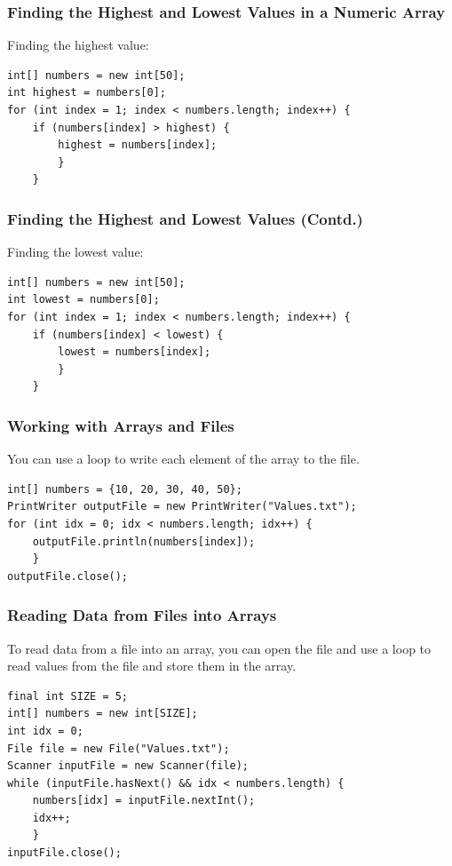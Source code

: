 \documentclass[11pt]{beamer}
\begin{document}
\begin{frame}[fragile]
    \frametitle{Finding the Highest and Lowest Values in a Numeric Array}
    Finding the highest value:
    \begin{lstlisting}
int[] numbers = new int[50];
int highest = numbers[0];
for (int index = 1; index < numbers.length; index++) {
    if (numbers[index] > highest) {
        highest = numbers[index];
        }
    }
    \end{lstlisting}
\end{frame}

\begin{frame}[fragile]
    \frametitle{Finding the Highest and Lowest Values (Contd.)}
    Finding the lowest value:
    \begin{lstlisting}
int[] numbers = new int[50];
int lowest = numbers[0];
for (int index = 1; index < numbers.length; index++) {
    if (numbers[index] < lowest) {
        lowest = numbers[index];
        }
    }
    \end{lstlisting}
\end{frame}

\begin{frame}[fragile]
    \frametitle{Working with Arrays and Files}
    You can use a loop to write each element of the array to the file.
    \begin{lstlisting}
int[] numbers = {10, 20, 30, 40, 50};
PrintWriter outputFile = new PrintWriter("Values.txt");
for (int idx = 0; idx < numbers.length; idx++) {
    outputFile.println(numbers[index]);
    }
outputFile.close();
    \end{lstlisting}
\end{frame}

\begin{frame}[fragile]
    \frametitle{Reading Data from Files into Arrays}
    To read data from a file into an array, you can open the file and use a loop to read values from the file and store them in the array.
    \begin{lstlisting}
final int SIZE = 5;
int[] numbers = new int[SIZE];
int idx = 0;
File file = new File("Values.txt");
Scanner inputFile = new Scanner(file);
while (inputFile.hasNext() && idx < numbers.length) {
    numbers[idx] = inputFile.nextInt();
    idx++;
    }
inputFile.close();
    \end{lstlisting}
\end{frame}
\end{document}
